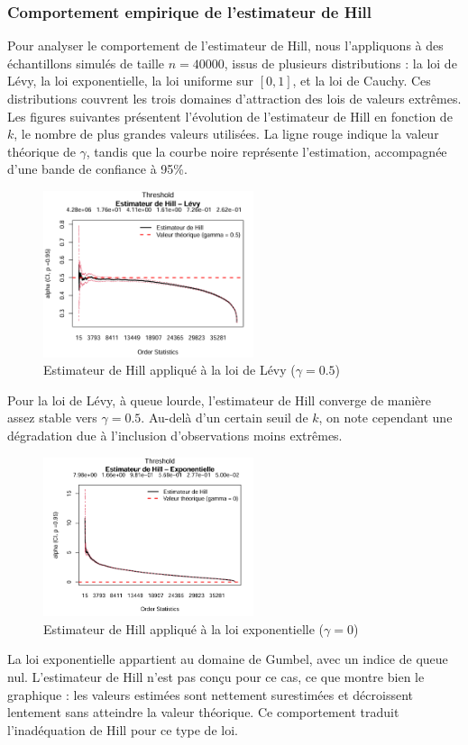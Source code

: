 \documentclass{article}
\theoremstyle{plain}
\theoremstyle{definition}
\theoremstyle{plain}
\begin{document}
\subsubsection{Comportement empirique de l’estimateur de Hill}
Pour analyser le comportement de l’estimateur de Hill, nous l’appliquons à des échantillons simulés de taille $n = 40000$, issus de plusieurs distributions : la loi de Lévy, la loi exponentielle, la loi uniforme sur \([0,1]\), et la loi de Cauchy. Ces distributions couvrent les trois domaines d’attraction des lois de valeurs extrêmes.
Les figures suivantes présentent l’évolution de l’estimateur de Hill en fonction de $k$, le nombre de plus grandes valeurs utilisées. La ligne rouge indique la valeur théorique de $\gamma$, tandis que la courbe noire représente l’estimation, accompagnée d’une bande de confiance à 95\%.
\begin{figure}[H]
    \centering
    \includegraphics[width=0.55\textwidth]{./image_hill_pickands/levy_hill.png}
    \caption{Estimateur de Hill appliqué à la loi de Lévy ($\gamma = 0.5$)}
\end{figure}
Pour la loi de Lévy, à queue lourde, l’estimateur de Hill converge de manière assez stable vers \(\gamma = 0.5\). Au-delà d’un certain seuil de \(k\), on note cependant une dégradation due à l’inclusion d’observations moins extrêmes.

\begin{figure}[H]
    \centering
    \includegraphics[width=0.55\textwidth]{./image_hill_pickands/exponentielle_hill.png}
    \caption{Estimateur de Hill appliqué à la loi exponentielle ($\gamma = 0$)}
\end{figure}
La loi exponentielle appartient au domaine de Gumbel, avec un indice de queue nul. L’estimateur de Hill n’est pas conçu pour ce cas, ce que montre bien le graphique : les valeurs estimées sont nettement surestimées et décroissent lentement sans atteindre la valeur théorique. Ce comportement traduit l’inadéquation de Hill pour ce type de loi.
\end{document}
